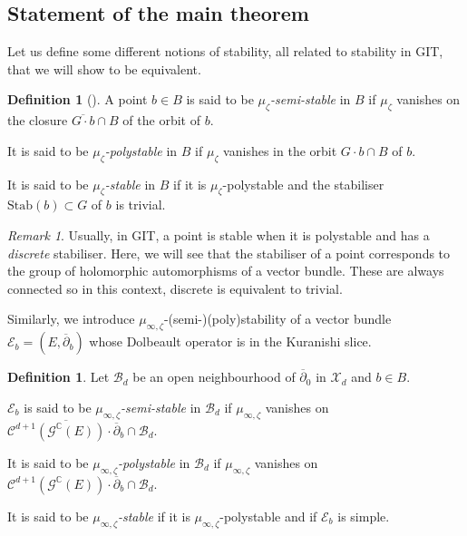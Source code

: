 \documentclass{article}
\theoremstyle{remark}
\newtheorem*{remark}{Remark}
\theoremstyle{definition}
\newtheorem{definition}[theorem]{Definition}
\newcommand{\C}{\mathbb{C}}
\newcommand{\Stab}{\mathrm{Stab}}
\newcommand{\E}{\mathcal{E}}
\newcommand{\G}{\mathcal{G}}
\newcommand{\mB}{\mathcal{B}}
\newcommand{\mC}{\mathcal{C}}
\newcommand{\mX}{\mathcal{X}}
\newcommand{\dbar}{\overline{\partial}}
\begin{document}
\subsection{Statement of the main theorem}

Let us define some different notions of stability, all related to stability in GIT, that we will show to be equivalent.
\begin{definition}[{\cite[Definition 7.1]{GRS}}]
    A point $b \in B$ is said to be \textit{$\mu_\zeta$-semi-stable} in $B$ if $\mu_\zeta$ vanishes on the closure $\overline{G \cdot b} \cap B$ of the orbit of $b$.
    
    It is said to be \textit{$\mu_\zeta$-polystable} in $B$ if $\mu_\zeta$ vanishes in the orbit $G \cdot b \cap B$ of $b$.
    
    It is said to be \textit{$\mu_\zeta$-stable} in $B$ if it is $\mu_\zeta$-polystable and the stabiliser $\Stab(b) \subset G$ of $b$ is trivial.
\end{definition}

\begin{remark}
    Usually, in GIT, a point is stable when it is polystable and has a \textit{discrete} stabiliser. Here, we will see that the stabiliser of a point corresponds to the group of holomorphic automorphisms of a vector bundle. These are always connected so in this context, discrete is equivalent to trivial.
\end{remark}

Similarly, we introduce $\mu_{\infty,\zeta}$-(semi-)(poly)stability of a vector bundle $\E_b = (E,\dbar_b)$ whose Dolbeault operator is in the Kuranishi slice.
\begin{definition}
    Let $\mB_d$ be an open neighbourhood of $\dbar_0$ in $\mX_d$ and $b \in B$.
    
    $\E_b$ is said to be \textit{$\mu_{\infty,\zeta}$-semi-stable} in $\mB_d$ if $\mu_{\infty,\zeta}$ vanishes on $\overline{\mC^{d + 1}(\G^\C(E)) \cdot \dbar_b} \cap \mB_d$.
    
    It is said to be \textit{$\mu_{\infty,\zeta}$-polystable} in $\mB_d$ if $\mu_{\infty,\zeta}$ vanishes on $\mC^{d + 1}(\G^\C(E)) \cdot \dbar_b \cap \mB_d$.
    
    It is said to be \textit{$\mu_{\infty,\zeta}$-stable} if it is $\mu_{\infty,\zeta}$-polystable and if $\E_b$ is simple.
\end{definition}
\end{document}
